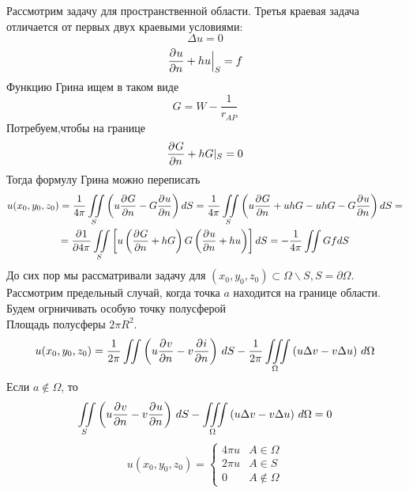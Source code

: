 Рассмотрим задачу для пространственной области. Третья краевая задача отличается от первых двух краевыми условиями:\\
\[
	\Delta u = 0
\]
\[
	\frac{\partial^{}u}{\partial n^{}} + h u \Big|_S = f
\]
Функцию Грина ищем в таком виде\\
\[
	G = W - \frac{1}{r_{AP}}
\]
Потребуем,чтобы на границе \[
	\frac{\partial^{}G}{\partial n^{}} + h G|_S = 0
\]
Тогда  формулу Грина можно переписать\\
\begin{multline*}
	u(x_0, y_0, z_0) = \frac{1}{4 \pi} \iint\limits_S \left( u \frac{\partial^{}G}{\partial n^{}} - G \frac{\partial^{}u}{\partial n^{}} \right) dS = \frac{1}{4 \pi} \iint\limits_S \left( u \frac{\partial^{}G}{\partial n^{}} + u h G - u h G - G \frac{\partial^{}u}{\partial n^{}}\right) dS = \\ = \frac{\partial^{}1}{\partial 4 \pi^{}} \iint\limits_S \left[ u \left( \frac{\partial^{}G}{\partial n^{}} + h G \right) G \left( \frac{\partial^{}u}{\partial n^{}} + h u\right)\right] dS = - \frac{1}{4 \pi} \iint\limits G f dS
\end{multline*}
До сих пор мы рассматривали задачу для $(x_0, y_0, z_0) \subset \Omega \backslash S, S = \partial\Omega$. 
Рассмотрим предельный случай, когда точка $a$ находится на границе области.
Будем огрничивать особую точку полусферой\\
Площадь полусферы $2 \pi R^2$.
\[
	u(x_0, y_0, z_0) = \frac{1}{2 \pi} \iint \left(u \frac{\partial^{}v}{\partial n^{}} - v \frac{\partial^{}i}{\partial n^{}} \right)\, dS - \frac{1}{2 \pi} \iiint\limits_\Omega \left(u\Delta v - v \Delta u \right)\, d\Omega
\]
Если $a \notin \Omega$, то 
\[
	\iint\limits_S \left(u \frac{\partial^{}v}{\partial n^{}} - v \frac{\partial^{}u}{\partial n^{}} \right)\, dS - \iiint\limits_\Omega \left(u\Delta v - v \Delta u \right)\, d\Omega = 0
\]
\[
	u(x_0, y_0, z_0) = \begin{cases} 
						4 \pi u & A \in \Omega \\
						2 \pi u & A \in S \\
						0 &  A  \notin  \Omega
					\end{cases}
\]


